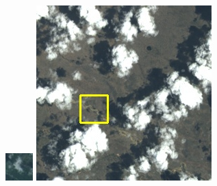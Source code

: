 \documentclass[10pt,UTF8,fntef]{ctexart}
\begin{document}
\begin{multicols}{2}
\begin{figure}[H]
{\begin{minipage}[b]{0.15\linewidth}
            \includegraphics[width=1\linewidth]{../log/spoon4/cut/tmp_cut_LC80460282014171LGN00_12556_color.jpg}\vspace{4pt}
            \includegraphics[width=1\linewidth]{../log/spoon4/cut/LC80980712014024LGN00_15440_color.jpg}\vspace{4pt}

\end{minipage}}
\end{figure}
\end{multicols}
\end{document}
